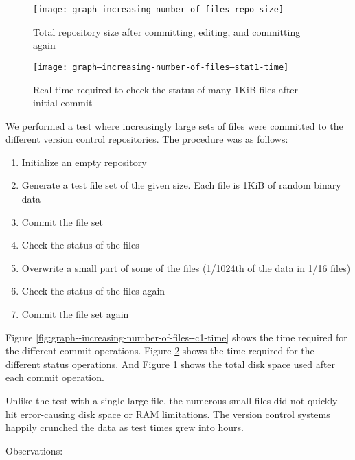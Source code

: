 \documentclass[a4paper]{article}
\begin{document}
\begin{figure}[p]
  \caption{Total repository size after committing, editing, and committing again}
  \label{fig:graph--increasing-number-of-files--repo-size}
  \centering
    \texttt{[image: graph--increasing-number-of-files--repo-size]}
\end{figure}

\iffalse

\begin{figure}[p]
  \caption{Real time required to check the status of many 1KiB files after
  initial commit}
  \label{fig:graph--increasing-number-of-files--stat1-time}
  \centering
    \texttt{[image: graph--increasing-number-of-files--stat1-time]}
\end{figure}

We performed a test where increasingly large sets of files were committed to the
different version control repositories. The procedure was as follows:

\begin{enumerate}
    \setlength{\itemsep}{0pt}
    \setlength{\parskip}{0pt}
    \setlength{\parsep}{0pt}
    \item Initialize an empty repository
    \item Generate a test file set of the given size. Each file is 1KiB of
        random binary data
    \item Commit the file set
    \item Check the status of the files
    \item Overwrite a small part of some of the files (1/1024th of the data in
        1/16 files)
    \item Check the status of the files again
    \item Commit the file set again
\end{enumerate}

Figure \ref{fig:graph--increasing-number-of-files--c1-time} shows the time
required for the different commit operations. Figure
\ref{fig:graph--increasing-number-of-files--stat1-time} shows the time required
for the different status operations. And Figure
\ref{fig:graph--increasing-number-of-files--repo-size} shows the total disk space
used after each commit operation.

Unlike the test with a single large file, the numerous small files did not
quickly hit error-causing disk space or RAM limitations. The version control
systems happily crunched the data as test times grew into hours.

Observations:
\end{document}
